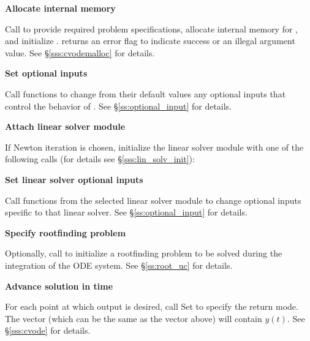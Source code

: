 \begin{Steps}
\item\label{i:cvode_malloc} 
  {\bf Allocate internal memory}

  Call  
  to provide required problem specifications,
  allocate internal memory for {\cvode}, 
  and initialize {\cvode}.
   returns an error flag to indicate success or an illegal
  argument value.  See \S\ref{sss:cvodemalloc} for details.
  
\item
  {\bf Set optional inputs}

  Call  functions to change from their default values any
  optional inputs that control the behavior of {\cvode}.
  See \S\ref{ss:optional_input} for details.

\item\label{i:lin_solver} 
  {\bf Attach linear solver module}

  If Newton iteration is chosen, initialize the linear solver module
  with one of the following calls (for details see \S\ref{sss:lin_solv_init}):

  {\s} 

  {\s} 


  
  
  
\item
  {\bf Set linear solver optional inputs}

  Call  functions from the selected linear solver module to
  change optional inputs specific to that linear solver.
  See \S\ref{ss:optional_input} for details.

\item
  {\bf Specify rootfinding problem}

  Optionally, call  to initialize a rootfinding problem
  to be solved during the integration of the ODE system.
  See \S\ref{ss:root_uc} for details.

\item
  {\bf Advance solution in time}

  For each point at which output is desired, call
  Set  to specify the return mode.
  The vector  (which can be the same as
  the vector  above) will contain $y(t)$.
  See \S\ref{sss:cvode} for details.
  

\end{Steps}
